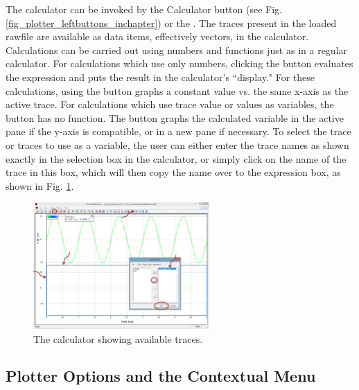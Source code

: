 The calculator can be invoked by the Calculator button (see Fig. \ref{fig_plotter_leftbuttons_inchapter}) or the .  The traces present in the loaded rawfile are available as data items, effectively vectors, in the calculator.  Calculations can be carried out using numbers and functions just as in a regular calculator.  For calculations which use only numbers, clicking the  button evaluates the expression and puts the result in the calculator's ``display."  For these calculations, using the  button graphs a constant value vs. the same x-axis as the active trace.  For calculations which use trace value or values as variables, the  button has no function.  The  button graphs the calculated variable in the active pane if the y-axis is compatible, or in a new pane if necessary.  To select the trace or traces to use as a variable, the user can either enter the trace names as shown exactly in the selection box in the calculator, or simply click on the name of the trace in this box, which will then copy the name over to the expression box, as shown in Fig. \ref{fig_plotter_usingcalculator}.

\begin{figure}
    \includegraphics[width=0.6\textwidth]
		{./figures/plotter_netlist_editor_figures/Plotter_AddingTraces_MultiPane.png} %
    \caption{{The calculator showing available traces.}}
  \label{fig_plotter_usingcalculator}
\end{figure}

\subsection{Plotter Options and the Contextual Menu}
\label{subsec_pane_plotteroptions}

